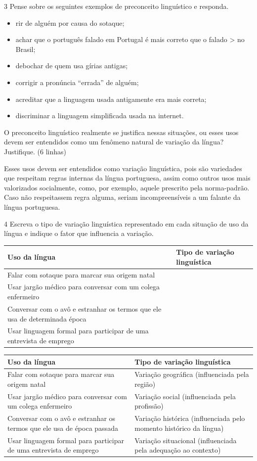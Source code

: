 \num{3} Pense sobre os seguintes exemplos de preconceito linguístico e
responda.

\begin{itemize}
\item
  rir de alguém por causa do sotaque;
\item
  achar que o português falado em Portugal é mais correto que o falado
  \textgreater{} no Brasil;
\item
  debochar de quem usa gírias antigas;
\item
  corrigir a pronúncia ``errada'' de alguém;
\item
  acreditar que a linguagem usada antigamente era mais correta;
\item
  discriminar a linguagem simplificada usada na internet.
\end{itemize}

O preconceito linguístico realmente se justifica nessas situações, ou
esses usos devem ser entendidos como um fenômeno natural de variação da
língua? Justifique. (6 linhas)

Esses usos devem ser entendidos como variação linguística, pois são
variedades que respeitam regras internas da língua portuguesa, assim
como outros usos mais valorizados socialmente, como, por exemplo, aquele
prescrito pela norma-padrão. Caso não respeitassem regra alguma, seriam
incompreensíveis a um falante da língua portuguesa.

\num{4} Escreva o tipo de variação linguística representado em cada
situação de uso da língua e indique o fator que influencia a variação.

\begin{longtable}[]{@{}ll@{}}
\toprule
\textbf{Uso da língua} & \textbf{Tipo de variação
linguística}\tabularnewline
\midrule
\endhead
Falar com sotaque para marcar sua origem natal &\tabularnewline
Usar jargão médico para conversar com um colega enfermeiro
&\tabularnewline
Conversar com o avô e estranhar os termos que ele usa de determinada
época &\tabularnewline
Usar linguagem formal para participar de uma entrevista de emprego
&\tabularnewline
\bottomrule
\end{longtable}

\begin{longtable}[]{@{}ll@{}}
\toprule
\textbf{Uso da língua} & \textbf{Tipo de variação
linguística}\tabularnewline
\midrule
\endhead
Falar com sotaque para marcar sua origem natal & Variação geográfica
(influenciada pela região)\tabularnewline
Usar jargão médico para conversar com um colega enfermeiro & Variação
social (influenciada pela profissão)\tabularnewline
Conversar com o avô e estranhar os termos que ele usa de época passada &
Variação histórica (influenciada pelo momento histórico da
língua)\tabularnewline
Usar linguagem formal para participar de uma entrevista de emprego &
Variação situacional (influenciada pela adequação ao
contexto)\tabularnewline
\bottomrule
\end{longtable}

